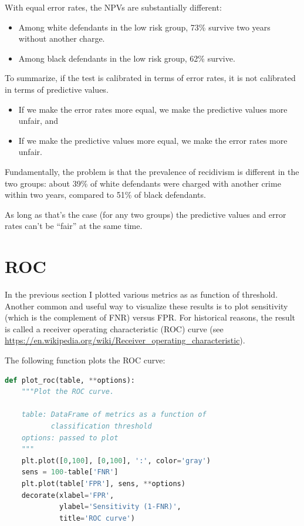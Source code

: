 With equal error rates, the NPVs are substantially different:

\begin{itemize}
\item
  Among white defendants in the low risk group, 73\% survive two years
  without another charge.
\item
  Among black defendants in the low risk group, 62\% survive.
\end{itemize}

To summarize, if the test is calibrated in terms of error rates, it is
not calibrated in terms of predictive values.

\begin{itemize}
\item
  If we make the error rates more equal, we make the predictive values
  more unfair, and
\item
  If we make the predictive values more equal, we make the error rates
  more unfair.
\end{itemize}

Fundamentally, the problem is that the prevalence of recidivism is
different in the two groups: about 39\% of white defendants were charged
with another crime within two years, compared to 51\% of black
defendants.

As long as that's the case (for any two groups) the predictive values
and error rates can't be ``fair'' at the same time.

\hypertarget{roc}{%
\section{ROC}\label{roc}}

In the previous section I plotted various metrics as as function of
threshold. Another common and useful way to visualize these results is
to plot sensitivity (which is the complement of FNR) versus FPR. For
historical reasons, the result is called a receiver operating
characteristic (ROC) curve (see
\url{https://en.wikipedia.org/wiki/Receiver_operating_characteristic}).

The following function plots the ROC curve:

\begin{lstlisting}[language=Python]
def plot_roc(table, **options):
    """Plot the ROC curve.
    
    table: DataFrame of metrics as a function of 
           classification threshold
    options: passed to plot
    """
    plt.plot([0,100], [0,100], ':', color='gray')
    sens = 100-table['FNR']
    plt.plot(table['FPR'], sens, **options)
    decorate(xlabel='FPR',
             ylabel='Sensitivity (1-FNR)',
             title='ROC curve')
\end{lstlisting}

